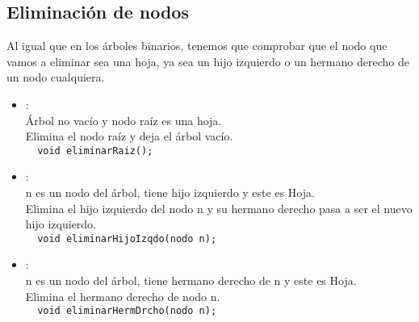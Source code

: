 \subsection*{Eliminación de nodos}
Al igual que en los árboles binarios, tenemos que comprobar que el nodo que vamos a eliminar sea una hoja, ya sea un hijo izquierdo o un hermano derecho de un nodo cualquiera.
\begin{itemize}
  \item {}:\\
   Árbol no vacío y nodo raíz es una hoja.\\
   Elimina el nodo raíz y deja el árbol vacío.\\
  \verb|  void eliminarRaiz();|
  \item {}:\\
   n es un nodo del árbol, tiene hijo izquierdo y este es Hoja.\\
   Elimina el hijo izquierdo del nodo n y su hermano derecho pasa a ser el nuevo hijo izquierdo.\\
  \verb|  void eliminarHijoIzqdo(nodo n);|
  \item {}:\\
   n es un nodo del árbol, tiene hermano derecho de n y este es Hoja.\\
   Elimina el hermano derecho de nodo n.\\
  \verb|  void eliminarHermDrcho(nodo n);|
\end{itemize}
